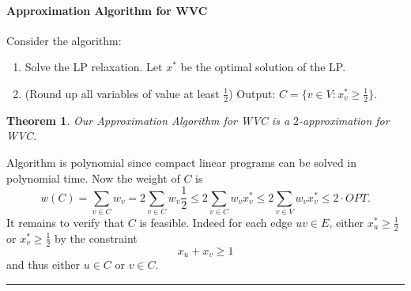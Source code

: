 \documentclass[letterpaper,12pt,oneside,onecolumn]{article}
\newenvironment{proof}{{\bf Proof:  }}{\hfill\rule{2mm}{2mm}}
\newtheorem{theorem}[fact]{Theorem}
\begin{document}
\paragraph{Approximation Algorithm for WVC}
Consider the algorithm:
\begin{enumerate}
\item Solve the LP relaxation. Let $x^*$ be the optimal solution of the LP.
\item (Round up all variables of value at least $\frac{1}{2}$) Output: $C = \{v \in V: x^*_v \geq \frac{1}{2}\}$.
\end{enumerate}
\begin{theorem}
Our Approximation Algorithm for WVC is a $2$-approximation for WVC.
\end{theorem}
\begin{proof}
Algorithm is polynomial since compact linear programs can be solved in polynomial time. Now the weight of $C$ is
$$w(C) = \sum_{v \in C} w_v = 2\sum_{v \in C} w_v \frac{1}{2} \leq 2 \sum_{v \in C}w_v x^*_v \leq 2 \sum_{v \in V} w_v x^*_v \leq 2\cdot OPT.$$
It remains to verify that $C$ is feasible. Indeed for each edge $uv \in E$, either $x^*_u \geq \frac{1}{2}$ or $x^*_v \geq \frac{1}{2}$ by the constraint
$$x_u + x_v \geq 1$$
and thus either $u \in C$ or $v \in C$.
\end{proof}
\end{document}
